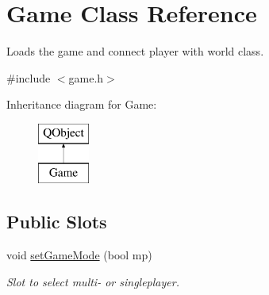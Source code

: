 \hypertarget{class_game}{}\section{Game Class Reference}
\label{class_game}


Loads the game and connect player with world class.  




{\ttfamily \#include $<$game.\+h$>$}

Inheritance diagram for Game\+:\begin{figure}[H]
\begin{center}
\leavevmode
\includegraphics[height=2.000000cm]{class_game}
\end{center}
\end{figure}
\subsection*{Public Slots}
\begin{DoxyCompactItemize}
\item 
void \mbox{\hyperlink{class_game_a79c2ba5d0577929a299a51cbbaba383a}{set\+Game\+Mode}} (bool mp)
\begin{DoxyCompactList}\small\item\em Slot to select multi-\/ or singleplayer. \end{DoxyCompactList}\end{DoxyCompactItemize}
